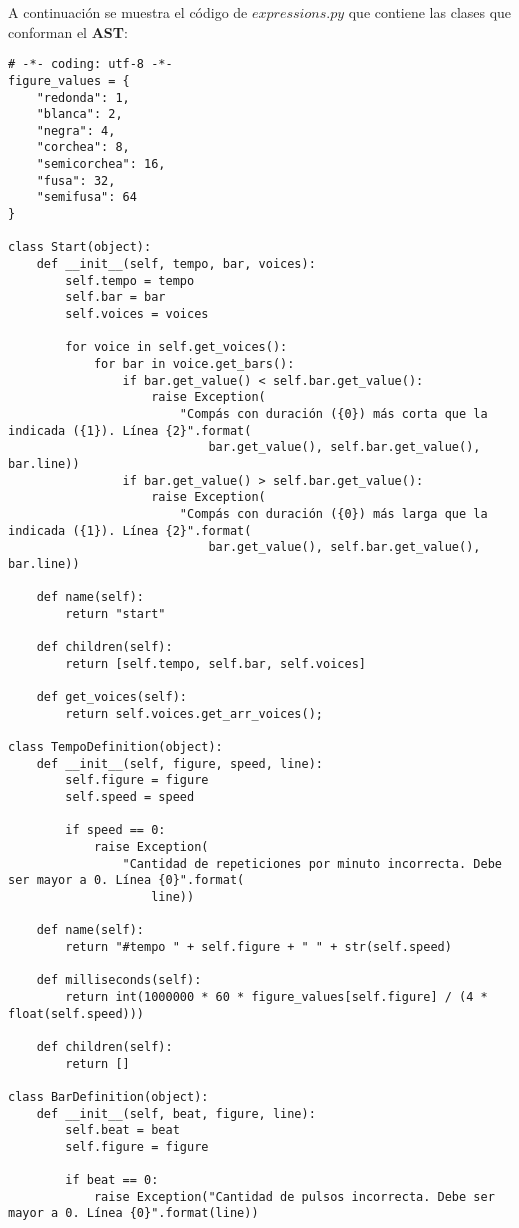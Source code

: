A continuación se muestra el código de $expressions.py$ que contiene las clases que conforman el \textbf{AST}:

\begin{verbatim}
# -*- coding: utf-8 -*-
figure_values = {
    "redonda": 1,
    "blanca": 2,
    "negra": 4,
    "corchea": 8,
    "semicorchea": 16,
    "fusa": 32,
    "semifusa": 64
}

class Start(object):
    def __init__(self, tempo, bar, voices):
        self.tempo = tempo
        self.bar = bar
        self.voices = voices

        for voice in self.get_voices():
            for bar in voice.get_bars():
                if bar.get_value() < self.bar.get_value():
                    raise Exception(
                        "Compás con duración ({0}) más corta que la indicada ({1}). Línea {2}".format(
                            bar.get_value(), self.bar.get_value(), bar.line))
                if bar.get_value() > self.bar.get_value():
                    raise Exception(
                        "Compás con duración ({0}) más larga que la indicada ({1}). Línea {2}".format(
                            bar.get_value(), self.bar.get_value(), bar.line))

    def name(self):
        return "start"

    def children(self):
        return [self.tempo, self.bar, self.voices]

    def get_voices(self):
        return self.voices.get_arr_voices();

class TempoDefinition(object):
    def __init__(self, figure, speed, line):
        self.figure = figure
        self.speed = speed

        if speed == 0:
            raise Exception(
                "Cantidad de repeticiones por minuto incorrecta. Debe ser mayor a 0. Línea {0}".format(
                    line))

    def name(self):
        return "#tempo " + self.figure + " " + str(self.speed)

    def milliseconds(self):
        return int(1000000 * 60 * figure_values[self.figure] / (4 * float(self.speed)))

    def children(self):
        return []

class BarDefinition(object):
    def __init__(self, beat, figure, line):
        self.beat = beat
        self.figure = figure

        if beat == 0:
            raise Exception("Cantidad de pulsos incorrecta. Debe ser mayor a 0. Línea {0}".format(line))


\end{verbatim}
